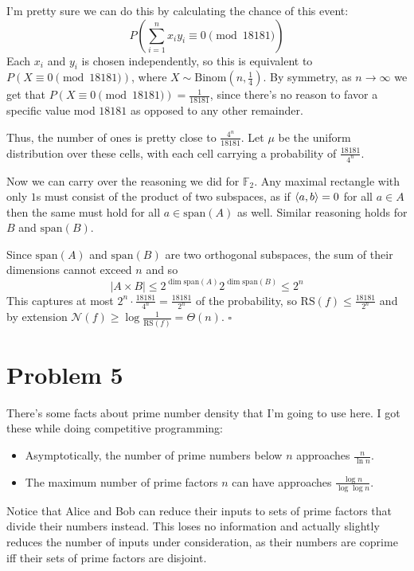 \documentclass[12pt]{article}
\begin{document}
I'm pretty sure we can do this by calculating the chance of this event:
\[P\left(\sum_{i=1}^{n} x_iy_i \equiv 0 \pmod{18181}\right)\]
Each $x_i$ and $y_i$ is chosen independently,
so this is equivalent to $P(X \equiv 0 \pmod{18181})$,
where $X \sim \text{Binom}\left(n, \frac{1}{4}\right)$.
By symmetry, as $n \to \infty$ we get that $P(X \equiv 0 \pmod{18181})=\frac{1}{18181}$,
since there's no reason to favor a specific value mod $18181$ as opposed
to any other remainder.

Thus, the number of ones is pretty close to $\frac{4^n}{18181}$.
Let $\mu$ be the uniform distribution over these cells, with each cell
carrying a probability of $\frac{18181}{4^n}$.

Now we can carry over the reasoning we did for $\mathbb{F}_2$.
Any maximal rectangle with only $1$s must consist of the product
of two subspaces, as if $\braket{a, b}=0$ for all $a \in A$ then the same
must hold for all $a \in \text{span}(A)$ as well.
Similar reasoning holds for $B$ and $\text{span}(B)$.

Since $\text{span}(A)$ and $\text{span}(B)$ are two orthogonal subspaces,
the sum of their dimensions cannot exceed $n$ and so
\[|A \times B| \le 2^{\dim \text{span}(A)}2^{\dim \text{span}(B)} \le 2^n\]
This captures at most $2^n \cdot \frac{18181}{4^n}=\frac{18181}{2^n}$ of the probability,
so $\text{RS}(f) \le \frac{18181}{2^n}$ and by extension
$\mathcal{N}(f) \ge \log \frac{1}{\text{RS}(f)} = \Theta(n)$. $\square$

\newpage

\section*{Problem 5}

There's some facts about prime number density that I'm going to use here.
I got these while doing competitive programming:
\begin{itemize}
    \item Asymptotically, the number of prime numbers below $n$ approaches $\frac{n}{\ln n}$.
    \item The maximum number of prime factors $n$ can have approaches $\frac{\log n}{\log \log n}$.
\end{itemize}

Notice that Alice and Bob can reduce their inputs to sets of prime factors that
divide their numbers instead.
This loses no information and actually slightly reduces the number of inputs
under consideration, as their numbers are coprime iff their sets of prime
factors are disjoint.
\end{document}
